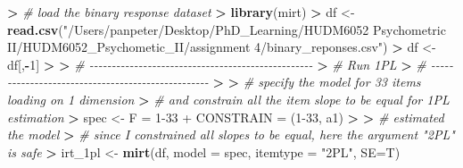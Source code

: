 \documentclass[
]{article}
\newenvironment{Shaded}{\begin{snugshade}}{\end{snugshade}}
\newcommand{\AttributeTok}[1]{\textcolor[rgb]{0.13,0.29,0.53}{#1}}
\newcommand{\CommentTok}[1]{\textcolor[rgb]{0.56,0.35,0.01}{\textit{#1}}}
\newcommand{\DecValTok}[1]{\textcolor[rgb]{0.00,0.00,0.81}{#1}}
\newcommand{\ErrorTok}[1]{\textcolor[rgb]{0.64,0.00,0.00}{\textbf{#1}}}
\newcommand{\FunctionTok}[1]{\textcolor[rgb]{0.13,0.29,0.53}{\textbf{#1}}}
\newcommand{\NormalTok}[1]{#1}
\newcommand{\OtherTok}[1]{\textcolor[rgb]{0.56,0.35,0.01}{#1}}
\newcommand{\SpecialCharTok}[1]{\textcolor[rgb]{0.81,0.36,0.00}{\textbf{#1}}}
\newcommand{\StringTok}[1]{\textcolor[rgb]{0.31,0.60,0.02}{#1}}
\begin{document}
\begin{Shaded}
\begin{Highlighting}[]
\SpecialCharTok{\textgreater{}} \CommentTok{\# load the binary response dataset}
\ErrorTok{\textgreater{}} \FunctionTok{library}\NormalTok{(mirt)}
\SpecialCharTok{\textgreater{}}\NormalTok{ df }\OtherTok{\textless{}{-}} \FunctionTok{read.csv}\NormalTok{(}\StringTok{"/Users/panpeter/Desktop/PhD\_Learning/HUDM6052 Psychometric II/HUDM6052\_Psychometic\_II/assignment 4/binary\_reponses.csv"}\NormalTok{)}
\SpecialCharTok{\textgreater{}}\NormalTok{ df }\OtherTok{\textless{}{-}}\NormalTok{ df[,}\SpecialCharTok{{-}}\DecValTok{1}\NormalTok{]}
\SpecialCharTok{\textgreater{}} 
\ErrorTok{\textgreater{}} \CommentTok{\# {-}{-}{-}{-}{-}{-}{-}{-}{-}{-}{-}{-}{-}{-}{-}{-}{-}{-}{-}{-}{-}{-}{-}{-}{-}{-}{-}{-}{-}{-}{-}{-}{-}{-}{-}{-}{-}{-}{-}{-}{-}{-}{-}{-}{-}{-}{-}{-}{-}{-}}
\ErrorTok{\textgreater{}} \CommentTok{\#                       Run 1PL}
\ErrorTok{\textgreater{}} \CommentTok{\# {-}{-}{-}{-}{-}{-}{-}{-}{-}{-}{-}{-}{-}{-}{-}{-}{-}{-}{-}{-}{-}{-}{-}{-}{-}{-}{-}{-}{-}{-}{-}{-}{-}{-}{-}{-}{-}{-}{-}{-}{-}{-}{-}{-}{-}{-}{-}{-}{-}{-}}
\ErrorTok{\textgreater{}} 
\ErrorTok{\textgreater{}} \CommentTok{\# specify the model for 33 items loading on 1 dimension}
\ErrorTok{\textgreater{}} \CommentTok{\# and constrain all the item slope to be equal for 1PL estimation}
\ErrorTok{\textgreater{}}\NormalTok{ spec }\OtherTok{\textless{}{-}} \StringTok{\textquotesingle{}F = 1{-}33}
\StringTok{+ CONSTRAIN = (1{-}33, a1)\textquotesingle{}}
\SpecialCharTok{\textgreater{}} 
\ErrorTok{\textgreater{}} \CommentTok{\# estimated the model}
\ErrorTok{\textgreater{}} \CommentTok{\# since I constrained all slopes to be equal, here the argument "2PL" is safe}
\ErrorTok{\textgreater{}}\NormalTok{ irt\_1pl }\OtherTok{\textless{}{-}} \FunctionTok{mirt}\NormalTok{(df, }\AttributeTok{model =}\NormalTok{ spec, }\AttributeTok{itemtype =} \StringTok{"2PL"}\NormalTok{, }\AttributeTok{SE=}\NormalTok{T)}

\end{Highlighting}
\end{Shaded}
\end{document}
